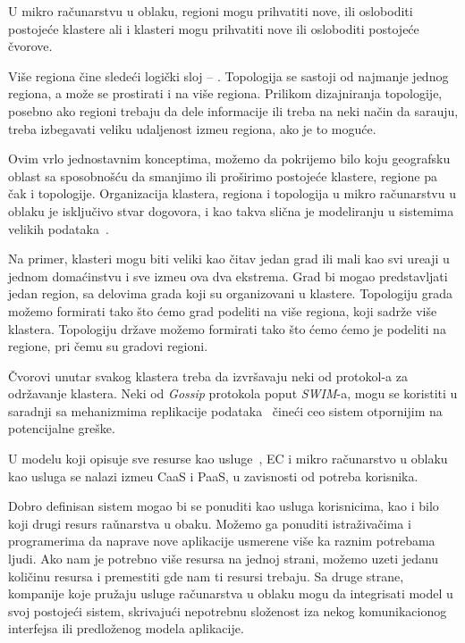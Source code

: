 U mikro ra\v cunarstvu u oblaku, regioni mogu prihvatiti nove, ili osloboditi postoje\'ce klastere ali i klasteri mogu prihvatiti nove ili osloboditi postoje\'ce \v cvorove.

Vi\v se regiona \v cine slede\'ci logi\v cki sloj -- . Topologija se sastoji od najmanje jednog regiona, a mo\v ze se prostirati i na vi\v se regiona. Prilikom dizajniranja topologije, posebno ako regioni trebaju da dele informacije ili treba na neki na\v cin da sara\dj uju, treba izbegavati veliku udaljenost izme\dj u regiona, ako je to mogu\'ce. 

Ovim vrlo jednostavnim konceptima, mo\v zemo da pokrijemo bilo koju geografsku oblast sa sposobno\v s\'cu da smanjimo ili pro\v sirimo postoje\'ce klastere, regione pa \v cak i topologije. Organizacija klastera, regiona i topologija u mikro ra\v cunarstvu u oblaku je isklju\v civo stvar dogovora, i kao takva sli\v cna je modeliranju u sistemima velikih podataka~\cite {SonbolOAA20, WangCAL14}.

Na primer, klasteri mogu biti veliki kao \v citav jedan grad ili mali kao svi ure\dj aji u jednom doma\'cinstvu i sve izme\dj u ova dva ekstrema. Grad bi mogao predstavljati jedan region, sa delovima grada koji su organizovani u klastere. Topologiju grada mo\v zemo formirati tako što \'cemo grad podeliti na vi\v se regiona, koji sadr\v ze vi\v se klastera. Topologiju dr\v zave mo\v zemo formirati tako \v sto \'cemo \'cemo je podeliti na regione, pri \v cemu su gradovi regioni. 

\v Cvorovi unutar svakog klastera treba da izvr\v savaju neki od protokol-a za odr\v zavanje klastera. Neki od \textit{Gossip} protokola poput \textit{SWIM}-a\cite {DasGM02}, mogu se koristiti u saradnji sa mehanizmima replikacije podataka~\cite {LiBCL20, CauCBFCEB16, CRDTS_Nuno} \v cine\'ci ceo sistem otpornijim na potencijalne gre\v ske. 

U modelu koji opisuje sve resurse kao usluge~\cite {DuanFZSNH15}, EC i mikro ra\v cunarstvo u oblaku kao usluga se nalazi izme\dj u CaaS i PaaS, u zavisnosti od potreba korisnika.

Dobro definisan sistem mogao bi se ponuditi kao usluga korisnicima, kao i bilo koji drugi resurs ra\v unarstva u obaku. Mo\v zemo ga ponuditi istra\v ziva\v cima i programerima da naprave nove aplikacije usmerene vi\v se ka raznim potrebama ljudi. Ako nam je potrebno vi\v se resursa na jednoj strani, mo\v zemo uzeti jedanu koli\v cinu resursa i premestiti gde nam ti resursi trebaju. Sa druge strane, kompanije koje pru\v zaju usluge ra\v cunarstva u oblaku mogu da integrisati model u svoj postoje\'ci sistem, skrivaju\'ci nepotrebnu slo\v zenost iza nekog komunikacionog interfejsa ili predlo\v zenog modela aplikacije.

